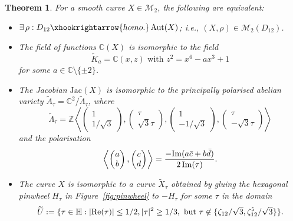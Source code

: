 \documentclass[a4paper,11pt]{amsart}
\numberwithin{equation}{section}
\numberwithin{figure}{section}
\numberwithin{table}{section}
\newtheorem{theorem}{Theorem}[section]
\newcommand{\C}{\mathbb{C}}
\newcommand{\Z}{\mathbb{Z}}
\DeclareMathOperator{\Aut}{{\rm{Aut}}}
\begin{document}
\begin{theorem}\label{thm:M2(D12)}
    For a smooth curve $X\in\mathcal{M}_{2}$, the following are equivalent:
    \begin{itemize}
        \item $\exists\,\rho:D_{12}\xhookrightarrow{homo.}\Aut(X)$; i.e., $(X,\rho)\in\mathcal{M}_{2}(D_{12})$.
        \item The field of functions $\C(X)$ is isomorphic to the field
        \[\widetilde{K}_{a} = \C(x,z)\text{ with }z^2 = x^6-ax^3+1\]
        for some $a\in\C\setminus\{\pm2\}$.
        \item The Jacobian $\text{Jac}(X)$ is isomorphic to the principally polarised abelian variety $\widetilde{A}_{\tau} = \C^2/\widetilde{\Lambda}_{\tau}$, where
        \[\widetilde{\Lambda}_{\tau} = \Z\left\langle\begin{pmatrix}
            1 \\
            1/\sqrt{3}
        \end{pmatrix},\begin{pmatrix}
            \tau \\
            \sqrt{3}\tau
        \end{pmatrix},\begin{pmatrix}
            1 \\
            -1/\sqrt{3}
        \end{pmatrix},\begin{pmatrix}
        \tau \\
            -\sqrt{3}\tau
        \end{pmatrix}\right\rangle\]
        and the polarisation
        \[\left\langle\begin{pmatrix}
            a \\
            b
        \end{pmatrix},\begin{pmatrix}
            c \\
            d
        \end{pmatrix}\right\rangle = \frac{-{\rm{Im}}(a\bar{c}+b\bar{d})}{2\,{\rm{Im}}(\tau)}.\]
        \item The curve $X$ is isomorphic to a curve $\widetilde{X}_{\tau}$ obtained by gluing the hexagonal pinwheel $H_{\tau}$ in Figure~\ref{fig:pinwheel} to $-H_{\tau}$ for some $\tau$ in the domain
        \[\widetilde{U} := \{\tau\in\mathbb{H}: |{\rm{Re}}(\tau)|\leq 1/2, |\tau|^2\geq1/3,\text{ but } \tau\not\in\{\zeta_{12}/\sqrt{3},\zeta_{12}^5/\sqrt{3}\}\}.\]
    \end{itemize}
\end{theorem}
\end{document}
